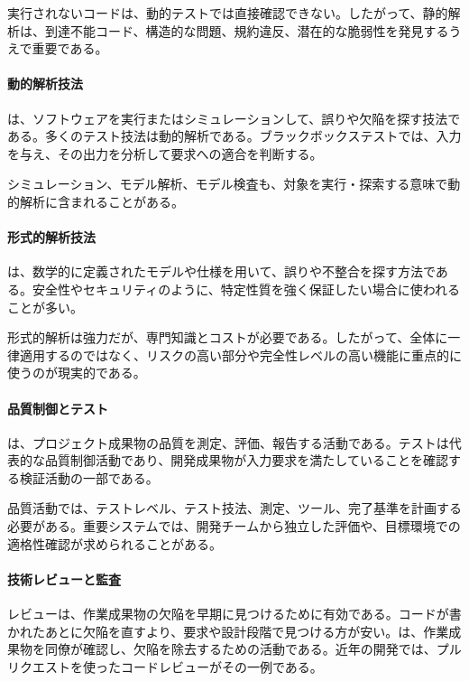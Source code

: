 \documentclass[a4paper,11pt]{ltjsarticle}
\numberwithin{figure}{section}
\numberwithin{table}{section}
\begin{document}
実行されないコードは、動的テストでは直接確認できない。したがって、静的解析は、到達不能コード、構造的な問題、規約違反、潜在的な脆弱性を発見するうえで重要である。

\paragraph{動的解析技法}
は、ソフトウェアを実行またはシミュレーションして、誤りや欠陥を探す技法である。多くのテスト技法は動的解析である。ブラックボックステストでは、入力を与え、その出力を分析して要求への適合を判断する。

シミュレーション、モデル解析、モデル検査も、対象を実行・探索する意味で動的解析に含まれることがある。

\paragraph{形式的解析技法}
は、数学的に定義されたモデルや仕様を用いて、誤りや不整合を探す方法である。安全性やセキュリティのように、特定性質を強く保証したい場合に使われることが多い。

形式的解析は強力だが、専門知識とコストが必要である。したがって、全体に一律適用するのではなく、リスクの高い部分や完全性レベルの高い機能に重点的に使うのが現実的である。

\paragraph{品質制御とテスト}
は、プロジェクト成果物の品質を測定、評価、報告する活動である。テストは代表的な品質制御活動であり、開発成果物が入力要求を満たしていることを確認する検証活動の一部である。

品質活動では、テストレベル、テスト技法、測定、ツール、完了基準を計画する必要がある。重要システムでは、開発チームから独立した評価や、目標環境での適格性確認が求められることがある。

\paragraph{技術レビューと監査}
レビューは、作業成果物の欠陥を早期に見つけるために有効である。コードが書かれたあとに欠陥を直すより、要求や設計段階で見つける方が安い。は、作業成果物を同僚が確認し、欠陥を除去するための活動である。近年の開発では、プルリクエストを使ったコードレビューがその一例である。
\end{document}
